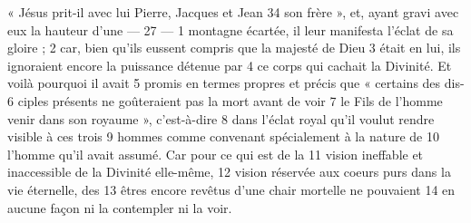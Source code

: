 « Jésus prit-il avec lui Pierre, Jacques et Jean	 
34	 	son frère », et, ayant gravi avec eux la hauteur d'une	 
 	--- 27 ---	 
1	 	montagne écartée, il leur manifesta l'éclat de sa gloire ;	 
2	 	car, bien qu'ils eussent compris que la majesté de Dieu	 
3	 	était en lui, ils ignoraient encore la puissance détenue par	 
4	 	ce corps qui cachait la Divinité. Et voilà pourquoi il avait	 
5	 	promis en termes propres et précis que « certains des dis-	 
6	 	ciples présents ne goûteraient pas la mort avant de voir	 
7	 	le Fils de l'homme venir dans son royaume », c'est-à-dire	 
8	 	dans l'éclat royal qu'il voulut rendre visible à ces trois	 
9	 	hommes comme convenant spécialement à la nature de	 
10	 	l'homme qu'il avait assumé. Car pour ce qui est de la	 
11	 	vision ineffable et inaccessible de la Divinité elle-même,	 
12	 	vision réservée aux coeurs purs dans la vie éternelle, des	 
13	 	êtres encore revêtus d'une chair mortelle ne pouvaient	 
14	 	en aucune façon ni la contempler ni la voir.